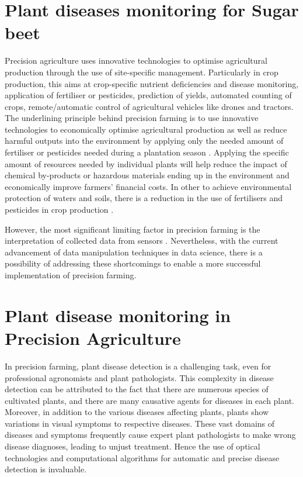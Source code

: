 \section{Plant diseases monitoring for Sugar beet}
Precision agriculture uses innovative technologies to optimise agricultural production through the use of site-specific management. Particularly in crop production, this aims at crop-specific nutrient deficiencies and disease monitoring, application of fertiliser or pesticides, prediction of yields, automated counting of crops, remote/automatic control of agricultural vehicles like drones and tractors. The underlining principle behind precision farming is to use innovative technologies to economically optimise agricultural production as well as reduce harmful outputs into the environment by applying only the needed amount of fertiliser or pesticides needed during a plantation season \cite{auernhammer2001precision}. Applying the specific amount of resources needed by individual plants will help reduce the impact of chemical by-products or hazardous materials ending up in the environment and economically improve farmers’ financial costs. In other to achieve environmental protection of waters and soils, there is a reduction in the use of fertilisers and pesticides in crop production \cite{otero2005fertiliser}.

However, the most significant limiting factor in precision farming is the interpretation of collected data from sensors \cite{ondoua2017precision}. Nevertheless, with the current advancement of data manipulation techniques in data science, there is a possibility of addressing these shortcomings to enable a more successful implementation of precision farming.

\section{Plant disease monitoring in Precision Agriculture}
In precision farming, plant disease detection is a challenging task, even for professional agronomists and plant pathologists. This complexity in disease detection can be attributed to the fact that there are numerous species of cultivated plants, and there are many causative agents for diseases in each plant. Moreover, in addition to the various diseases affecting plants, plants show variations in visual symptoms to respective diseases. These vast domains of diseases and symptoms frequently cause expert plant pathologists to make wrong disease diagnoses, leading to unjust treatment. Hence the use of optical technologies and computational algorithms for automatic and precise disease detection is invaluable.

